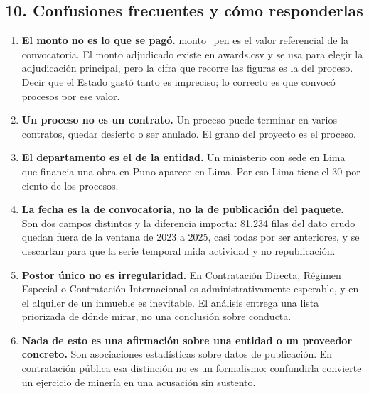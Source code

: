 \documentclass[11pt]{article}
\begin{document}
\subsection*{10. Confusiones frecuentes y cómo responderlas}
\begin{enumerate}
  \item \textbf{El monto no es lo que se pagó.} monto\_\allowbreak{}pen es el valor referencial de la convocatoria. El monto adjudicado existe en awards.csv y se usa para elegir la adjudicación principal, pero la cifra que recorre las figuras es la del proceso. Decir que el Estado gastó tanto es impreciso; lo correcto es que convocó procesos por ese valor.
  \item \textbf{Un proceso no es un contrato.} Un proceso puede terminar en varios contratos, quedar desierto o ser anulado. El grano del proyecto es el proceso.
  \item \textbf{El departamento es el de la entidad.} Un ministerio con sede en Lima que financia una obra en Puno aparece en Lima. Por eso Lima tiene el 30 por ciento de los procesos.
  \item \textbf{La fecha es la de convocatoria, no la de publicación del paquete.} Son dos campos distintos y la diferencia importa: 81.234 filas del dato crudo quedan fuera de la ventana de 2023 a 2025, casi todas por ser anteriores, y se descartan para que la serie temporal mida actividad y no republicación.
  \item \textbf{Postor único no es irregularidad.} En Contratación Directa, Régimen Especial o Contratación Internacional es administrativamente esperable, y en el alquiler de un inmueble es inevitable. El análisis entrega una lista priorizada de dónde mirar, no una conclusión sobre conducta.
  \item \textbf{Nada de esto es una afirmación sobre una entidad o un proveedor concreto.} Son asociaciones estadísticas sobre datos de publicación. En contratación pública esa distinción no es un formalismo: confundirla convierte un ejercicio de minería en una acusación sin sustento.
\end{enumerate}
\end{document}
